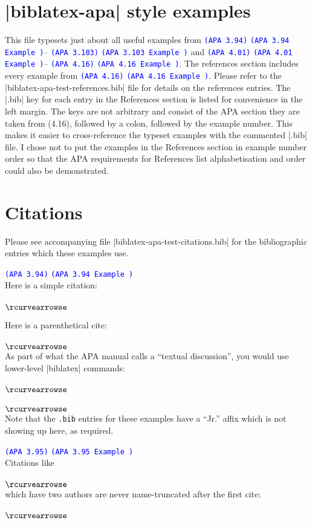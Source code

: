 \documentclass{article}
\newcommand\apa[2][]{\ifthenelse{\equal{#1}{}}%
                       {\textcolor{blue}{\texttt{(APA #2)}}}%
                       {\textcolor{blue}{\texttt{(APA #2 Example #1)}}}}
\def\apaex#1{\hbox{\hspace{-4em}\texttt{\small \detokenize{#1}}}\\ $\rcurvearrowse$ \textbf{#1}}
\begin{document}
\section*{|biblatex-apa| style examples}

This file typesets just about all useful examples from
\apa{3.94}--\apa{3.103} and \apa{4.01}--\apa{4.16}. The references section
includes every example from \apa{4.16}. Please refer to the
|biblatex-apa-test-references.bib| file for details on the references
entries. The |.bib| key for each entry in the References section is listed
for convenience in the left margin. The keys are not arbitrary and consist
of the APA section they are taken from (4.16), followed by a colon,
followed by the example number. This makes it easier to cross-reference
the typeset examples with the commented |.bib| file. I chose not to put the
examples in the References section in example number order so that the APA
requirements for References list alphabetisation and order could also be
demonstrated.

\section*{Citations}

\noindent Please see accompanying file |biblatex-apa-test-citations.bib|
for the bibliographic entries which these examples use.

\noindent\apa{3.94}\\
Here is a simple citation:\\
\apaex{\textcite{3.94}}

\noindent Here is a parenthetical cite:\\
\apaex{\parencite{3.94}}\\
As part of what the APA manual calls a ``textual discussion'', you would
use lower-level |biblatex| commands:\\
\apaex{\citeyear{3.94}}\\
\apaex{\citeauthor{3.94}}\\
Note that the \texttt{.bib} entries for these examples have a ``Jr.'' affix
which is not showing up here, as required.

\noindent\apa{3.95}\\
Citations like\\
\apaex{\textcite{3.95a}}\\
which have two authors are never name-truncated after the first cite:\\
\apaex{\textcite{3.95a}}
\end{document}
